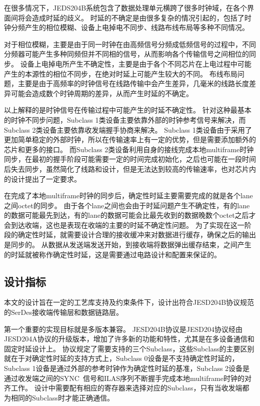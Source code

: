\documentclass[UTF8]{ctexart}
\begin{document}
在很多情况下，JEDS204B系统包含了数据处理单元横跨了很多时钟域，在各个界面间将会造成时延的歧义。
时延的不确定是由很多复杂的情况引起的，包括了时钟分频产生的相位模糊、设备上电掉电不同步、线路布线布局等多种不同情况。

对于相位模糊，主要是由于同一时钟在由高频信号分频成低频信号的过程中，不同分频器可能产生多种同频但并不同相的信号，从而影响各个传输信号之间相位的同步。
设备上电掉电所产生不确定性，主要是由于各个不同芯片在上电过程中可能产生的本源性的相位不同步，在绝对时延上可能产生较大的不同。
布线布局问题，主要是由于高频率的时钟信号在线路传输中会产生差异，几毫米的线路长度差异可能会造成数个时钟周期的差异，从而产生时延的不确定。

以上解释的是时钟信号在传输过程中可能产生的时延不确定性。
针对这种最基本的时钟不同步问题，Subclass 1类设备主要依靠外部的时钟参考信号来解决，而Subclass 2类设备主要依靠收发端握手协商来解决。
Subclass 1类设备由于采用了更加简单稳定的外部时钟，所以在传输速率上有一定的优势，但是需要添加额外的芯片和更多的接口。
而Subclass 2类设备利用自身的接线完成本地multiframe时钟同步，在最初的握手阶段可能需要一定的时间完成初始化，之后也可能在一段时间后失去同步，虽然简化了线路和设计，但是无法达到较高的传输速率，也对芯片内的设计提出了一定要求。

在完成了本地multiframe时钟的同步后，确定性时延主要需要完成的就是各个lane之间octet的同步。
由于各个lane之间也会由于时延问题产生不确定性，有的lane的数据可能最先到达，有的lane的数据可能会比最先收到的数据晚数个octet之后才会到达收端，这也是表现在收端的主要的时延不确定性问题。
为了实现在这一阶段的确定性时延，就需要设计合理的接收缓冲来对数据进行缓存，确保之后的输出是同步的。
从数据从发送端发送开始，到接收端将数据弹出缓存结束，之间产生的时延就被称作确定性时延，这是需要通过电路设计和配置来保证的。

\subsection{设计指标}

本文的设计旨在一定的工艺库支持及约束条件下，设计出符合JESD204B协议规范的SerDes接收端传输层和数据链路层。

第一个重要的实现目标就是多版本兼容。
JESD204B协议是JESD204协议经由JESD204A协议的升级版本，增加了许多新的功能和特性，尤其是在多设备通信和固定时延设计上。
协议规定了需要支持的三个Subclass，这些Subclass的主要区别就在于对确定性时延的支持方式上，Subclass 0设备是不支持确定性时延的，Subclass 1设备是通过外部的参考时钟作为确定性时延的基准，Subclass 2设备是通过收发端之间的SYNC~信号和ILAS序列不断握手完成本地multiframe时钟的对齐工作。
设计中需要配有相应的寄存器来选择对应的Subclass，只有当收发端都为相同的Subclass时才能正确通信。
\end{document}
